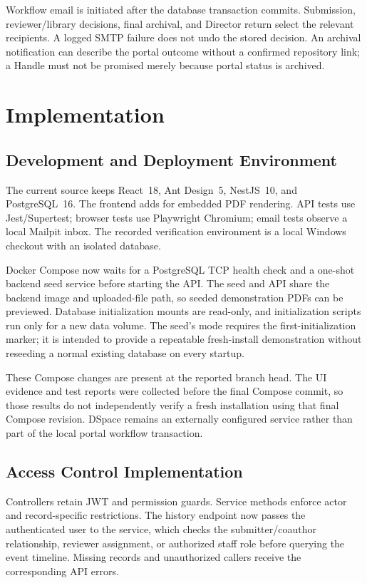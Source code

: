 \documentclass[11pt,a4paper]{report}
\newcommand{\code}[1]{{\small\texttt{\detokenize{#1}}}}
\begin{document}
Workflow email is initiated after the database transaction commits. Submission, reviewer/library decisions, final archival, and Director return select the relevant recipients. A logged SMTP failure does not undo the stored decision. An archival notification can describe the portal outcome without a confirmed repository link; a Handle must not be promised merely because portal status is archived.

\chapter{Implementation}
\label{ch:implementation}

\section{Development and Deployment Environment}
The current source keeps React~18, Ant Design~5, NestJS~10, and PostgreSQL~16. The frontend adds \code{pdfjs-dist} for embedded PDF rendering. API tests use Jest/Supertest; browser tests use Playwright Chromium; email tests observe a local Mailpit inbox. The recorded verification environment is a local Windows checkout with an isolated \code{thesis_test} database.

Docker Compose now waits for a PostgreSQL TCP health check and a one-shot backend seed service before starting the API. The seed and API share the backend image and uploaded-file path, so seeded demonstration PDFs can be previewed. Database initialization mounts are read-only, and initialization scripts run only for a new data volume. The seed's \code{--initial-only} mode requires the first-initialization marker; it is intended to provide a repeatable fresh-install demonstration without reseeding a normal existing database on every startup.

These Compose changes are present at the reported branch head. The UI evidence and test reports were collected before the final Compose commit, so those results do not independently verify a fresh installation using that final Compose revision. DSpace remains an externally configured service rather than part of the local portal workflow transaction.

\section{Access Control Implementation}
Controllers retain JWT and permission guards. Service methods enforce actor and record-specific restrictions. The history endpoint now passes the authenticated user to the service, which checks the submitter/coauthor relationship, reviewer assignment, or authorized staff role before querying the event timeline. Missing records and unauthorized callers receive the corresponding API errors.
\end{document}
